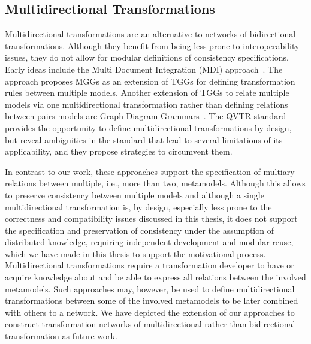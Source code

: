 \subsection{Multidirectional Transformations}

Multidirectional transformations are an alternative to networks of bidirectional transformations.
Although they benefit from being less prone to interoperability issues, they do not allow for modular definitions of consistency specifications.
Early ideas include the Multi Document Integration (MDI) approach~\cite{koenigs2006MGGs-SoSym}. The approach proposes \glspl{MGG} as an extension of \glspl{TGG} for defining transformation rules between multiple models.
Another extension of \glspl{TGG} to relate multiple models via one multidirectional transformation rather than defining relations between pairs models are Graph Diagram Grammars~\cite{trollmann2015TransformationTGGtoMultiModel-ICMT, trollmann2016SynchronizationTGGtoMultiModel-ICMT}.
The \gls{QVTR} standard~\cite{qvt} provides the opportunity to define multidirectional transformations by design, but \textcite{macedo2014FrameworkMultiDirectional-BX} reveal ambiguities in the standard that lead to several limitations of its applicability, and they propose strategies to circumvent them.

In contrast to our work, these approaches support the specification of multiary relations between multiple, i.e., more than two, metamodels.
Although this allows to preserve consistency between multiple models and although a single multidirectional transformation is, by design, especially less prone to the correctness and compatibility issues discussed in this thesis, it does not support the specification and preservation of consistency under the assumption of distributed knowledge, requiring independent development and modular reuse, which we have made in this thesis to support the motivational process.
Multidirectional transformations require a transformation developer to have or acquire knowledge about and be able to express all relations between the involved metamodels.
Such approaches may, however, be used to define multidirectional transformations between some of the involved metamodels to be later combined with others to a network.
We have depicted the extension of our approaches to construct transformation networks of multidirectional rather than bidirectional transformation as future work.

\ifisafour\else{}\fi

